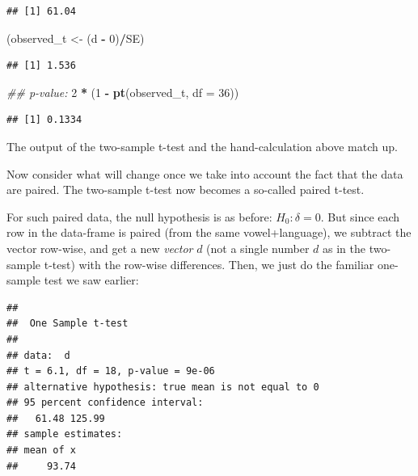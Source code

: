 \documentclass[12pt,]{krantz}
\newenvironment{Shaded}{\begin{snugshade}}{\end{snugshade}}
\newcommand{\CommentTok}[1]{\textcolor[rgb]{0.56,0.35,0.01}{\textit{#1}}}
\newcommand{\DataTypeTok}[1]{\textcolor[rgb]{0.13,0.29,0.53}{#1}}
\newcommand{\DecValTok}[1]{\textcolor[rgb]{0.00,0.00,0.81}{#1}}
\newcommand{\KeywordTok}[1]{\textcolor[rgb]{0.13,0.29,0.53}{\textbf{#1}}}
\newcommand{\NormalTok}[1]{#1}
\newcommand{\OperatorTok}[1]{\textcolor[rgb]{0.81,0.36,0.00}{\textbf{#1}}}
\newcommand{\StringTok}[1]{\textcolor[rgb]{0.31,0.60,0.02}{#1}}
\begin{document}
\begin{verbatim}
## [1] 61.04
\end{verbatim}

\begin{Shaded}
\begin{Highlighting}[]
\NormalTok{(observed_t <-}\StringTok{ }\NormalTok{(d }\OperatorTok{-}\StringTok{ }\DecValTok{0}\NormalTok{)}\OperatorTok{/}\NormalTok{SE)}
\end{Highlighting}
\end{Shaded}

\begin{verbatim}
## [1] 1.536
\end{verbatim}

\begin{Shaded}
\begin{Highlighting}[]
\CommentTok{## p-value:}
\DecValTok{2} \OperatorTok{*}\StringTok{ }\NormalTok{(}\DecValTok{1} \OperatorTok{-}\StringTok{ }\KeywordTok{pt}\NormalTok{(observed_t, }\DataTypeTok{df =} \DecValTok{36}\NormalTok{))}
\end{Highlighting}
\end{Shaded}

\begin{verbatim}
## [1] 0.1334
\end{verbatim}

The output of the two-sample t-test and the hand-calculation above match up.

Now consider what will change once we take into account the fact that the data are paired. The two-sample t-test now becomes a so-called paired t-test.

For such paired data, the null hypothesis is as before: \(H_0: \delta=0\). But since each row in the data-frame is paired (from the same vowel+language), we subtract the vector row-wise, and get a new \emph{vector} \(d\) (not a single number \(d\) as in the two-sample t-test) with the row-wise differences. Then, we just do the familiar one-sample test we saw earlier:

\begin{Shaded}
\end{Shaded}

\begin{verbatim}
## 
## 	One Sample t-test
## 
## data:  d
## t = 6.1, df = 18, p-value = 9e-06
## alternative hypothesis: true mean is not equal to 0
## 95 percent confidence interval:
##   61.48 125.99
## sample estimates:
## mean of x 
##     93.74
\end{verbatim}
\end{document}
